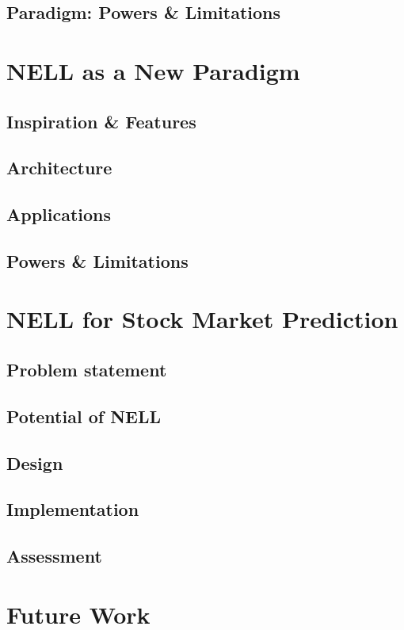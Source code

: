 \documentclass[12pt]{article}  %
\begin{document}
\subsection{Paradigm: Powers \& Limitations}



\section{NELL as a New Paradigm}

\subsection{Inspiration \& Features}
\subsection{Architecture}
\subsection{Applications}
\subsection{Powers \& Limitations}



\section{NELL for Stock Market Prediction}

\subsection{Problem statement}
\subsection{Potential of NELL}
\subsection{Design}
\subsection{Implementation}
\subsection{Assessment}


\section{Future Work}
\end{document}
